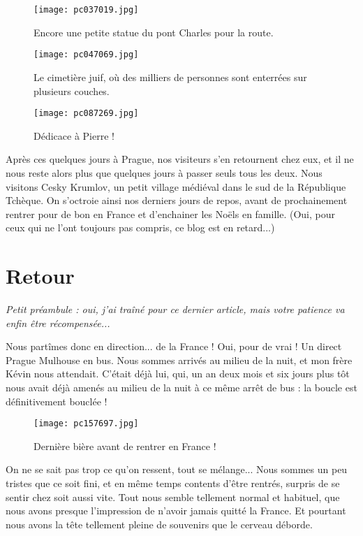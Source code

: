 \documentclass{book}
\begin{document}
\begin{figure}[h]
\centering
\texttt{[image: pc037019.jpg]}
\caption*{Encore une petite statue du pont Charles pour la route.}
\end{figure}


\begin{figure}[h]
\centering
\texttt{[image: pc047069.jpg]}
\caption*{Le cimetière juif, où des milliers de personnes sont enterrées sur plusieurs couches.}
\end{figure}


\begin{figure}[h]
\centering
\texttt{[image: pc087269.jpg]}
\caption*{Dédicace à Pierre !}
\end{figure}

Après ces quelques jours à Prague, nos visiteurs s'en retournent chez eux, et il ne nous reste alors plus que quelques jours à passer seuls tous les deux. Nous visitons Cesky Krumlov, un petit village médiéval dans le sud de la République Tchèque. On s'octroie ainsi nos derniers jours de repos, avant de prochainement rentrer pour de bon en France et d'enchainer les Noëls en famille. (Oui, pour ceux qui ne l'ont toujours pas compris, ce blog est en retard...)







\chapter{Retour}
\emph{Petit préambule : oui, j'ai traîné pour ce dernier article, mais votre patience va enfin être récompensée...}

Nous partîmes donc en direction... de la France ! Oui, pour de vrai ! Un direct Prague Mulhouse en bus. Nous sommes arrivés au milieu de la nuit, et mon frère Kévin nous attendait. C'était déjà lui, qui, un an deux mois et six jours plus tôt nous avait déjà amenés au milieu de la nuit à ce même arrêt de bus : la boucle est définitivement bouclée !


\begin{figure}[h]
\centering
\texttt{[image: pc157697.jpg]}
\caption*{Dernière bière avant de rentrer en France !}
\end{figure}

On ne se sait pas trop ce qu'on ressent, tout se mélange... Nous sommes un peu tristes que ce soit fini, et en même temps contents d'être rentrés, surpris de se sentir chez soit aussi vite. Tout nous semble tellement normal et habituel, que nous avons presque l'impression de n'avoir jamais quitté la France. Et pourtant nous avons la tête tellement pleine de souvenirs que le cerveau déborde.
\end{document}

